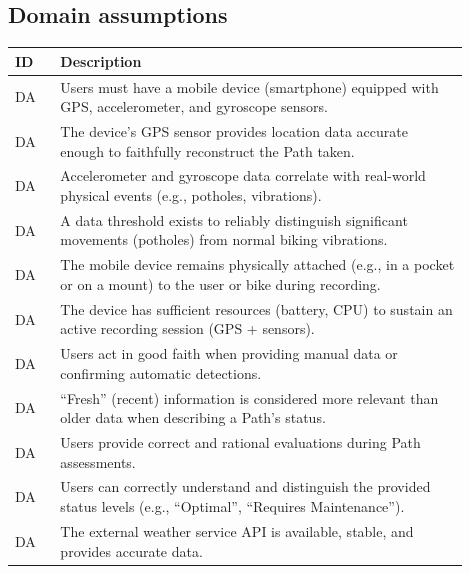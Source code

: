\subsection{Domain assumptions}
\label{subsec:domain_assumptions}%
\setcounter{da}{1}
\newcommand{\cda}{\theda\stepcounter{da}}
\begin{center}
    \begin{longtable}{ |l|p{0.9\linewidth}| }
        \hline
        \textbf{ID} & \textbf{Description} \\
        \hline
        DA\cda \label{da:1} & Users must have a mobile device (smartphone) equipped with GPS, accelerometer, and gyroscope sensors. \\
        \hline
        DA\cda \label{da:2} & The device's GPS sensor provides location data accurate enough to faithfully reconstruct the Path taken. \\
        \hline
        DA\cda \label{da:3} & Accelerometer and gyroscope data correlate with real-world physical events (e.g., potholes, vibrations). \\
        \hline
        DA\cda \label{da:4} & A data threshold exists to reliably distinguish significant movements (potholes) from normal biking vibrations. \\
        \hline
        DA\cda \label{da:5} & The mobile device remains physically attached (e.g., in a pocket or on a mount) to the user or bike during recording. \\
        \hline
        DA\cda \label{da:6} & The device has sufficient resources (battery, CPU) to sustain an active recording session (GPS + sensors). \\
        \hline
        DA\cda \label{da:7} & Users act in good faith when providing manual data or confirming automatic detections. \\
        \hline
        DA\cda \label{da:8} & “Fresh” (recent) information is considered more relevant than older data when describing a Path’s status. \\
        \hline
        DA\cda \label{da:9} & Users provide correct and rational evaluations during Path assessments. \\
        \hline
        DA\cda \label{da:10} & Users can correctly understand and distinguish the provided status levels (e.g., “Optimal”, “Requires Maintenance”). \\
        \hline
        DA\cda \label{da:11} & The external weather service API is available, stable, and provides accurate data. \\

\end{longtable}
\end{center}
